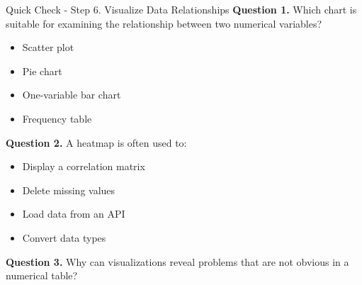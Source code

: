 \documentclass[aspectratio=169,11pt]{beamer}
\begin{document}
\begin{frame}[allowframebreaks]{Quick Check - Step 6. Visualize Data Relationships}
\footnotesize
\textbf{Question 1.} Which chart is suitable for examining the relationship between two numerical variables?\par\medskip
\begin{itemize}
\item[\textbf{A.}] Scatter plot
\item[\textbf{B.}] Pie chart
\item[\textbf{C.}] One-variable bar chart
\item[\textbf{D.}] Frequency table
\end{itemize}
\textbf{Question 2.} A heatmap is often used to:\par\medskip
\begin{itemize}
\item[\textbf{A.}] Display a correlation matrix
\item[\textbf{B.}] Delete missing values
\item[\textbf{C.}] Load data from an API
\item[\textbf{D.}] Convert data types
\end{itemize}
\textbf{Question 3.} Why can visualizations reveal problems that are not obvious in a numerical table?\par\medskip
\end{frame}
\end{document}
